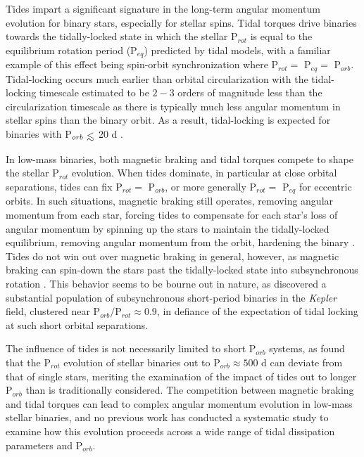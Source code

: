 \documentclass[twocolumn]{aastex61}
\def\lsim{~\rlap{$<$}{\lower 1.0ex\hbox{$\sim$}}}
\newcommand{\kepler}[0]{\textit{Kepler}\xspace}
\begin{document}
Tides impart a significant signature in the long-term angular momentum evolution for binary stars, especially for stellar spins. Tidal torques drive binaries towards the tidally-locked state in which the stellar P$_{rot}$ is equal to the equilibrium rotation period (P$_{eq}$) predicted by tidal models, with a familiar example of this effect being spin-orbit synchronization where P$_{rot} = $ P$_{eq} = $ P$_{orb}$.  Tidal-locking occurs much earlier than orbital circularization with the tidal-locking timescale estimated to be $2-3$ orders of magnitude less than the circularization timescale \citep{Zahn1989,Witte2002,Mazeh2008} as there is typically much less angular momentum in stellar spins than the binary orbit. As a result, tidal-locking is expected for binaries with P$_{orb} \lsim$ 20 d \citep[e.g.][]{Levato1974,Meibom2006,Mazeh2008,Zahn2008,Meibom2015}.

In low-mass binaries, both magnetic braking and tidal torques compete to shape the stellar P$_{rot}$ evolution. When tides dominate, in particular at close orbital separations, tides can fix P$_{rot} =$ P$_{orb}$, or more generally P$_{rot} =$ P$_{eq}$ for eccentric orbits. In such situations, magnetic braking still operates, removing angular momentum from each star, forcing tides to compensate for each star's loss of angular momentum by spinning up the stars to maintain the tidally-locked equilibrium, removing angular momentum from the orbit, hardening the binary \citep[][]{Verbunt1981,Repetto2014,Fleming2017}. Tides do not win out over magnetic braking in general, however, as magnetic braking can spin-down the stars past the tidally-locked state into subsynchronous rotation \citep[e.g. P$_{rot} >$ P$_{eq}$, ][]{Habets1989,Zahn1994,Keppens1997}. This behavior seems to be bourne out in nature, as \citet{Lurie2017} discovered a substantial population of subsynchronous short-period binaries in the \kepler field, clustered near P$_{orb}/$P$_{rot}{\approx} 0.9$, in defiance of the expectation of tidal locking at such short orbital separations. 

The influence of tides is not necessarily limited to short P$_{orb}$ systems, as \citet{Abt2004} found that the P$_{rot}$ evolution of stellar binaries out to P$_{orb} \approx 500$ d can deviate from that of single stars, meriting the examination of the impact of tides out to longer P$_{orb}$ than is traditionally considered. The competition between magnetic braking and tidal torques can lead to complex angular momentum evolution in low-mass stellar binaries, and no previous work has conducted a systematic study to examine how this evolution proceeds across a wide range of tidal dissipation parameters and P$_{orb}$.
\end{document}
